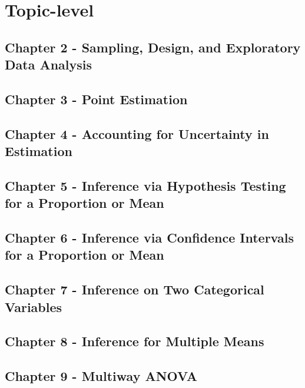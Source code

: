 \documentclass[]{book}
\begin{document}
\section{Topic-level}\label{topic-level}

\subsection{Chapter 2 - Sampling, Design, and Exploratory Data
Analysis}\label{chapter-2---sampling-design-and-exploratory-data-analysis}

\subsection{Chapter 3 - Point
Estimation}\label{chapter-3---point-estimation}

\subsection{Chapter 4 - Accounting for Uncertainty in
Estimation}\label{chapter-4---accounting-for-uncertainty-in-estimation}

\subsection{Chapter 5 - Inference via Hypothesis Testing for a
Proportion or
Mean}\label{chapter-5---inference-via-hypothesis-testing-for-a-proportion-or-mean}

\subsection{Chapter 6 - Inference via Confidence Intervals for a
Proportion or
Mean}\label{chapter-6---inference-via-confidence-intervals-for-a-proportion-or-mean}

\subsection{Chapter 7 - Inference on Two Categorical
Variables}\label{chapter-7---inference-on-two-categorical-variables}

\subsection{Chapter 8 - Inference for Multiple
Means}\label{chapter-8---inference-for-multiple-means}

\subsection{Chapter 9 - Multiway
ANOVA}\label{chapter-9---multiway-anova}
\end{document}
